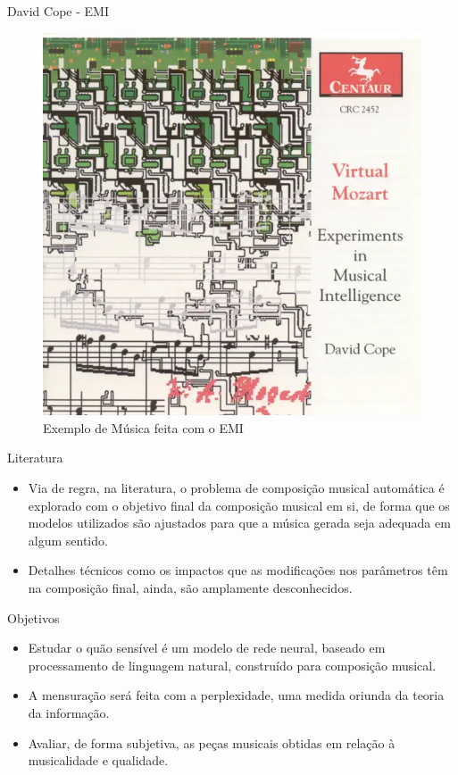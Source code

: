 \documentclass{beamer}
\begin{document}
    \begin{frame}{David Cope - EMI}
        \centering
        \begin{figure}
            \includegraphics[scale=0.35]{figuras/emi_music.PNG}
		    \caption{Exemplo de Música feita com o EMI}
	    \end{figure}
    \end{frame}

    \begin{frame}{Literatura}
        \begin{itemize}
            \justifying
            \item Via de regra, na literatura, o problema de composição musical automática é explorado com o objetivo final da composição musical em si, de forma que os modelos utilizados são ajustados para que a música gerada seja adequada em algum sentido.
            \item Detalhes técnicos como os impactos que as modificações nos parâmetros têm na composição final, ainda, são amplamente desconhecidos.
        \end{itemize}
    \end{frame}

    \begin{frame}{Objetivos}
        \begin{itemize}
            \justifying
            \item Estudar o quão sensível é um modelo de rede neural, baseado em processamento de linguagem natural, construído para composição musical.
            \item A mensuração será feita com a perplexidade, uma medida oriunda da teoria da informação.
            \item Avaliar, de forma subjetiva, as peças musicais obtidas em relação à musicalidade e qualidade.
        \end{itemize}
    \end{frame}
\end{document}

